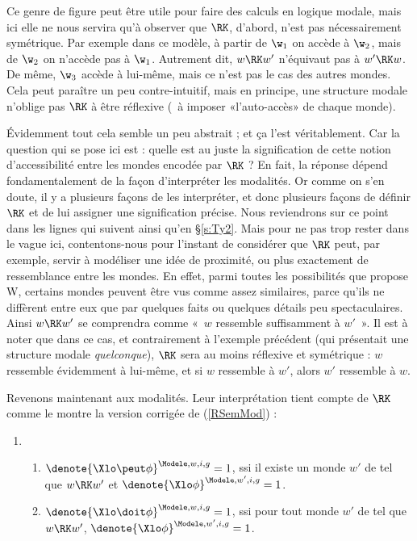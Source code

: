 Ce genre de figure peut être utile pour faire des calculs en logique modale, 
mais ici elle ne nous servira qu'à observer que $\RK$, d'abord, n'est pas nécessairement symétrique. Par exemple dans ce modèle, à partir de $\w_1$ on accède à $\w_2$, mais de $\w_2$ on n'accède pas %
à $\w_1$. Autrement dit, $w\RK w'$ n'équivaut pas à $w'\RK w$. 
De même, $\w_3$ accède à lui-même, mais ce n'est pas le cas des autres mondes. 
Cela peut paraître un peu contre-intuitif, mais en principe, une structure modale n'oblige pas $\RK$ à être réflexive (\ie\ à imposer «l'auto-accès» de chaque monde).

Évidemment tout cela semble un peu abstrait ; et ça l'est véritablement. 
Car la question qui se pose ici est : quelle est au juste la signification de cette notion d'accessibilité entre les mondes encodée par $\RK$ ?
En fait, la réponse dépend fondamentalement de la façon d'interpréter les modalités. Or comme on s'en doute, il y a plusieurs façons de les interpréter, et donc plusieurs façons de définir $\RK$ et de lui assigner une signification précise. Nous reviendrons sur ce point dans les lignes qui suivent ainsi qu'en \S\ref{s:Ty2}.  Mais pour ne pas trop rester dans le vague ici, contentons-nous pour l'instant de considérer que $\RK$ peut, par exemple, servir à modéliser une idée de proximité, ou plus exactement de ressemblance entre les mondes. 
En effet, parmi toutes les possibilités que propose \Unv W, certains mondes peuvent être vus comme assez similaires, parce qu'ils ne diffèrent entre eux que par quelques faits ou quelques détails peu spectaculaires. Ainsi $w\RK w'$ se comprendra comme «~$w$ ressemble suffisamment à $w'$~».  Il est à noter que dans ce cas, et contrairement à l'exemple précédent (qui présentait une structure modale \emph{quelconque}), $\RK$ sera au moins réflexive et symétrique : $w$ ressemble évidemment à lui-même, et si $w$ ressemble à $w'$, alors $w'$ ressemble à $w$.
 



Revenons maintenant aux modalités. Leur interprétation tient compte de $\RK$ comme le montre la version corrigée de (\RSem\ref{RSemMod}) :

\begin{defi}\label{d:semMod2}
\begin{enumerate}[sem] %
{\setcounter{enumi}{\value{RglSem}}}
\item
\begin{enumerate}
\item \(\denote{\Xlo\peut\phi}^{\Modele,w,i,g}=1\), ssi il existe un monde
  $w'$ de {} tel que $w \RK w'$ et \(\denote{\Xlo\phi}^{\Modele,w',i,g}=1\).
\item \(\denote{\Xlo\doit\phi}^{\Modele,w,i,g}=1\), ssi pour tout monde
  $w'$ de  tel que $w \RK w'$,  \(\denote{\Xlo\phi}^{\Modele,w',i,g}=1\).
\end{enumerate}
\setcounter{RglSem}{\value{enumi}}
\end{enumerate}
\end{defi}


